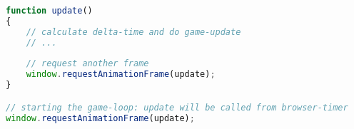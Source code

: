 \begin{lstlisting}[language=JavaScript, caption=Implementierung einer Game-Loop mit \textprog{requestAnimationFrame}]
function update()
{
	// calculate delta-time and do game-update
	// ...
	
	// request another frame
	window.requestAnimationFrame(update);
}

// starting the game-loop: update will be called from browser-timer
window.requestAnimationFrame(update);
\end{lstlisting}